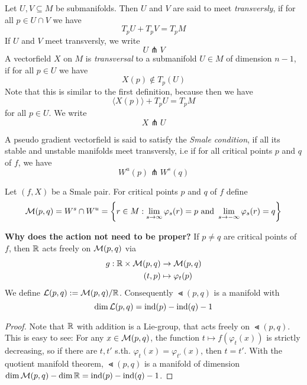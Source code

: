 \begin{definition}[Transversality]
    Let $U, V \subseteq M$ be submanifolds. Then $U$ and $V$ are said to meet 
    \textit{transversly}, if for all $p \in U \cap V$ we have
    \[ T_pU + T_pV = T_pM \]
    If $U$ and $V$ meet transversly, we write
    \[ U \pitchfork V \]
    A vectorfield $X$ on $M$ is \textit{transversal} to a submanifold $U \in M$ of dimension
    $n - 1$, if for all $p \in U$ we have 
    \[ X(p) \notin T_p(U) \]
    Note that this is similar to the first definition, because then we have
    \[ \langle X(p) \rangle + T_pU = T_pM \]
    for all $p \in U$.
    We write 
    \[ X \pitchfork U \]
\end{definition}

\begin{definition}
    A pseudo gradient vectorfield is said to satisfy the \textit{Smale condition}, if
    all its stable and unstable manifolds meet transversly, i.e if for all critical points
    $p$ and $q$ of $f$, we have
    \[ W^u(p) \pitchfork W^s(q) \]
\end{definition}

\begin{prop}
    Let $(f, X)$ be a Smale pair. For critical points $p$ and $q$ of $f$ define
    \[ { \mathcal{M} }(p, q) = W^s \cap W^u = 
    \left\{ r \in M : \lim_{s \to \infty} \varphi_s(r) = p \text{ and } 
    \lim_{s \to -\infty} \varphi_s(r) = q \right\} \]
\end{prop}

\begin{prop}
    \textbf{Why does the action not need to be proper?}
    If $p \neq q$ are critical points of $f$, then
    ${ \mathbb R }$ acts freely on ${ \mathcal{M} }(p, q)$ via 
    \begin{align*}
        g: { \mathbb R } \times { \mathcal{M} }(p, q) & \to { \mathcal{M} }(p, q) \\
        (t, p) & \mapsto \varphi_t(p)
    \end{align*}
    We define ${ \mathcal{L} }(p, q) := { \mathcal{M} }(p, q)/{ \mathbb R }$. 
    Consequently $\Lt(p, q)$ is a manifold with 
    \[ \dim { \mathcal{L} }(p, q)  = { \operatorname{ind} } (p) - { \operatorname{ind} } (q) - 1 \]
\end{prop}

\begin{proof}
    Note that ${ \mathbb R }$ with addition is a Lie-group, that acts freely on $\Lt(p, q)$. 
    This is easy to see:
    For any $x \in { \mathcal{M} }(p, q)$, the function $t \mapsto f(\varphi_t(x))$ is strictly
    decreasing, so if there are $t, t'$ s.th. $\varphi_t(x) = \varphi_{t'}(x)$, then
    $t = t'$. With the quotient manifold theorem, $\Lt(p, q)$ is a manifold of dimension
    $\dim { \mathcal{M} }(p, q) - \dim { \mathbb R } = { \operatorname{ind} } (p) - { \operatorname{ind} } (q) - 1 $.
\end{proof}

